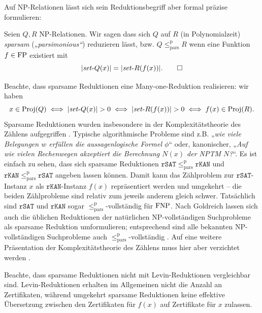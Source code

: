 Auf NP-Relationen lässt sich sein Reduktionsbegriff aber formal präzise formulieren:\pagebreak[3]

\begin{definition}
    \begin{samepage}
    Seien $Q, R$ NP-Relationen. Wir sagen dass sich $Q$ auf $R$ (in Polynomialzeit) \emph{sparsam} (\emph{„parsimonious“}) reduzieren lässt, bzw. $Q\leq_\mathrm{pars}^\mathrm p R$ wenn eine Funktion $f\in\mathrm{FP}$ existiert mit
    \[ |\mathit{set}\text{-}{}Q(x)|=|\mathit{set}\text{-}{}R(f(x))|. \qedhere \]
\end{samepage}
\end{definition}

Beachte, dass sparsame Reduktionen eine Many-one-Reduktion realisieren: wir haben 
\[ x\in\Proj(Q) \iff |\fset{}Q(x)|>0 \iff |\fset{}R(f(x))|>0 \iff f(x)\in\Proj(R). \]
Sparsame Reduktionen wurden insbesondere in der Komplexitätstheorie des Zählens aufgegriffen \parencites{simon_central_1975}{valiant_complexity_1979}. Typische algorithmische Probleme sind z.B. „\emph{wie viele Belegungen $w$ erfüllen die aussagenlogische Formel $\phi$}“ oder, kanonischer, „\emph{Auf wie vielen Rechenwegen akzeptiert die Berechnung $N(x)$ der NPTM $N$?}“. Es ist einfach zu sehen, dass sich sparsame Reduktionen $\mathtt{rSAT}\leq_\mathrm{pars}^\mathrm p \mathtt{rKAN}$ und $\mathtt{rKAN}\leq_\mathrm{pars}^\mathrm p \mathtt{rSAT}$ angeben lassen können. Damit kann das Zählproblem zur $\mathtt{rSAT}$-Instanz $x$ als $\mathtt{rKAN}$-Instanz $f(x)$ repräsentiert werden und umgekehrt – die beiden Zählprobleme sind relativ zum jeweils anderem gleich schwer. Tatsächlich sind $\mathtt{rSAT}$ und $\mathtt{rKAN}$ sogar $\leq_\mathrm{pars}^\mathrm p$-vollständig für $\mathrm{FNP}$. Nach Goldreich lassen sich auch die üblichen Reduktionen der natürlichen NP-vollständigen Suchprobleme als sparsame Reduktion umformulieren; entsprechend sind alle bekannten NP-vollständigen Suchprobleme auch $\leq_\mathrm{pars}^\mathrm p$-vollständig \textcite[204]{goldreich_computational_2008}. Auf eine weitere Präsentation der Komplexitätstheorie des Zählens muss hier aber verzichtet werden \parencites(siehe)()[Kap.~7]{wechsung_vorlesungen_2000}[Chap.~17]{arora_computational_2009}.

Beachte, dass sparsame Reduktionen nicht mit Levin-Reduktionen vergleichbar sind. Levin-Reduktionen erhalten im Allgemeinen nicht die Anzahl an Zertifikaten, während umgekehrt sparsame Reduktionen keine effektive Übersetzung zwischen den Zertifikaten für $f(x)$ auf Zertifikate für $x$ zulassen.

